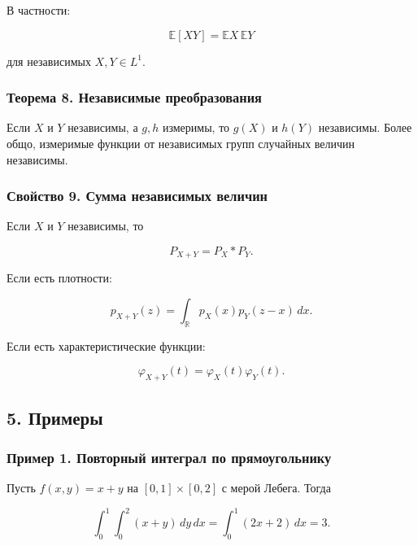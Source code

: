 \documentclass[
  11pt,
  a4paper,
]{article}
\begin{document}
В частности:

\[
\mathbb E[XY]=\mathbb EX\,\mathbb EY
\]

для независимых \(X,Y\in L^1\).

\subsubsection{Теорема 8. Независимые
преобразования}\label{ux442ux435ux43eux440ux435ux43cux430-8.-ux43dux435ux437ux430ux432ux438ux441ux438ux43cux44bux435-ux43fux440ux435ux43eux431ux440ux430ux437ux43eux432ux430ux43dux438ux44f}

Если \(X\) и \(Y\) независимы, а \(g,h\) измеримы, то \(g(X)\) и
\(h(Y)\) независимы. Более общо, измеримые функции от независимых групп
случайных величин независимы.

\subsubsection{Свойство 9. Сумма независимых
величин}\label{ux441ux432ux43eux439ux441ux442ux432ux43e-9.-ux441ux443ux43cux43cux430-ux43dux435ux437ux430ux432ux438ux441ux438ux43cux44bux445-ux432ux435ux43bux438ux447ux438ux43d}

Если \(X\) и \(Y\) независимы, то

\[
P_{X+Y}=P_X*P_Y.
\]

Если есть плотности:

\[
p_{X+Y}(z)=\int_{\mathbb R}p_X(x)p_Y(z-x)\,dx.
\]

Если есть характеристические функции:

\[
\varphi_{X+Y}(t)=\varphi_X(t)\varphi_Y(t).
\]

\subsection{5. Примеры}\label{ux43fux440ux438ux43cux435ux440ux44b}

\subsubsection{Пример 1. Повторный интеграл по
прямоугольнику}\label{ux43fux440ux438ux43cux435ux440-1.-ux43fux43eux432ux442ux43eux440ux43dux44bux439-ux438ux43dux442ux435ux433ux440ux430ux43b-ux43fux43e-ux43fux440ux44fux43cux43eux443ux433ux43eux43bux44cux43dux438ux43aux443}

Пусть \(f(x,y)=x+y\) на \([0,1]\times[0,2]\) с мерой Лебега. Тогда

\[
\int_0^1\int_0^2(x+y)\,dy\,dx
=
\int_0^1(2x+2)\,dx
=
3.
\]
\end{document}
